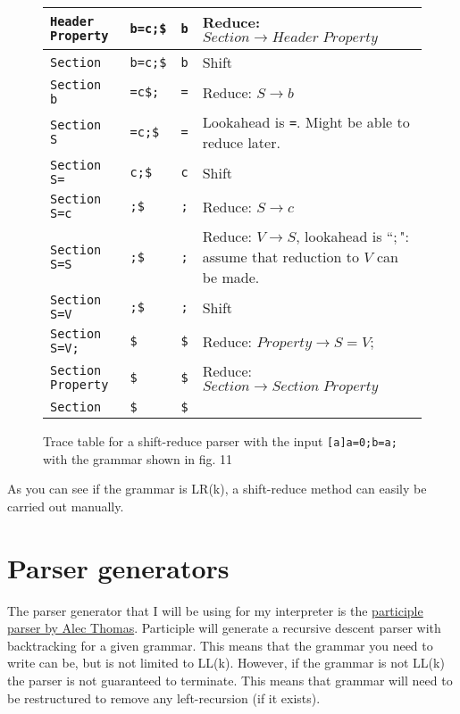 \documentclass[12pt, letterpaper]{article}
\theoremstyle{definition}
\begin{document}
\begin{figure}[H]
\begin{center}
\begin{tabular}{| m{3.5cm} | m{3cm} | m{2cm} | m{5cm} |}
            \verb|Header Property| & \verb|b=c;$| & \verb|b| & Reduce: $Section \rightarrow Header\;Property$\\
            \hline
            \verb|Section| & \verb|b=c;$| & \verb|b| & Shift\\
            \hline
            \verb|Section b| & \verb|=c$;| & \verb|=| & Reduce: $S \rightarrow b$\\
            \hline
            \verb|Section S| & \verb|=c;$| & \verb|=| & Lookahead is \verb|=|. Might be able to reduce later.\\
            \hline
            \verb|Section S=| & \verb|c;$| & \verb|c| & Shift\\
            \hline
            \verb|Section S=c| & \verb|;$| & \verb|;| & Reduce: $S \rightarrow c$\\
            \hline
            \verb|Section S=S| & \verb|;$| & \verb|;| & Reduce: $V \rightarrow S$, lookahead is ``$;$": assume that reduction to $V$ can be made.\\
            \hline
            \verb|Section S=V| & \verb|;$| & \verb|;| & Shift\\
            \hline
            \verb|Section S=V;| & \verb|$| & \verb|$| & Reduce: $Property \rightarrow S = V;$\\
            \hline
            \verb|Section Property| & \verb|$| & \verb|$| & Reduce: $Section \rightarrow Section\;Property$\\
            \hline
            \verb|Section| & \verb|$| & \verb|$| & \\
            \hline
        \end{tabular}
    \end{center}
    \cprotect\caption{Trace table for a shift-reduce parser with the input \verb|[a]a=0;b=a;| with the grammar shown in fig. 11}
\end{figure}

As you can see if the grammar is LR(k), a shift-reduce method can easily be carried out manually.

\section{Parser generators}

The parser generator that I will be using for my interpreter is the \href{https://github.com/alecthomas/participle#overview}{participle parser by Alec Thomas}. Participle will generate a recursive descent parser with backtracking for a given grammar. This means that the grammar you need to write can be, but is not limited to LL(k). However, if the grammar is not LL(k) the parser is not guaranteed to terminate. This means that grammar will need to be restructured to remove any left-recursion (if it exists).
\end{document}
